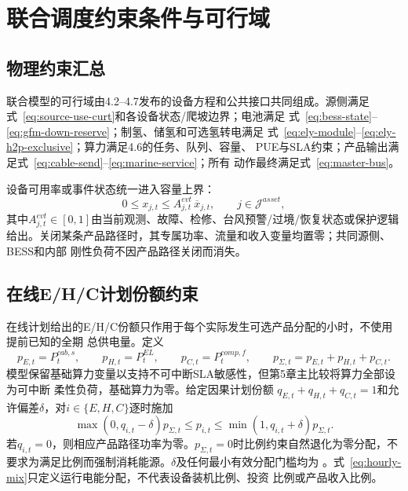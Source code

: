 \section{联合调度约束条件与可行域}
\label{sec:constraints}

\subsection{物理约束汇总}

联合模型的可行域由4.2--4.7发布的设备方程和公共接口共同组成。源侧满足
式~\eqref{eq:source-use-curt}和各设备状态/爬坡边界；电池满足
式~\eqref{eq:bess-state}--\eqref{eq:gfm-down-reserve}；制氢、储氢和可选氢转电满足
式~\eqref{eq:ely-module}--\eqref{eq:ely-h2p-exclusive}；算力满足4.6的任务、队列、容量、
PUE与SLA约束；产品输出满足式~\eqref{eq:cable-send}--\eqref{eq:marine-service}；所有
动作最终满足式~\eqref{eq:master-bus}。

设备可用率或事件状态统一进入容量上界：
\begin{equation}
0\le x_{j,t}\le A_{j,t}^{evt}\,\overline x_{j,t},
\qquad j\in\mathcal J^{asset},
\label{eq:availability-general}
\end{equation}
其中$A_{j,t}^{evt}\in[0,1]$由当前观测、故障、检修、台风预警/过境/恢复状态或保护逻辑
给出。关闭某条产品路径时，其专属功率、流量和收入变量均置零；共同源侧、BESS和内部
刚性负荷不因产品路径关闭而消失。

\subsection{在线E/H/C计划份额约束}

在线计划给出的E/H/C份额只作用于每个实际发生可选产品分配的小时，不使用提前已知的全期
总供电量。定义
\begin{equation}
p_{E,t}=P_t^{cab,s},\qquad
p_{H,t}=P_t^{EL},\qquad
p_{C,t}=P_t^{comp,f},\qquad
p_{\Sigma,t}=p_{E,t}+p_{H,t}+p_{C,t}.
\label{eq:hourly-mix-def}
\end{equation}
模型保留基础算力变量以支持不可中断SLA敏感性，但第5章主比较将算力全部设为可中断
柔性负荷，基础算力为零。给定因果计划份额
$q_{E,t}+q_{H,t}+q_{C,t}=1$和允许偏差$\delta$，对$i\in\{E,H,C\}$逐时施加
\begin{equation}
\max(0,q_{i,t}-\delta)p_{\Sigma,t}
\le p_{i,t}\le
\min(1,q_{i,t}+\delta)p_{\Sigma,t}.
\label{eq:hourly-mix}
\end{equation}
若$q_{i,t}=0$，则相应产品路径功率为零。$p_{\Sigma,t}=0$时比例约束自然退化为零分配，不
要求为满足比例而强制消耗能源。$\delta$及任何最小有效分配门槛均为
\assumptiontag。式~\eqref{eq:hourly-mix}只定义运行电能分配，不代表设备装机比例、投资
比例或产品收入比例。

